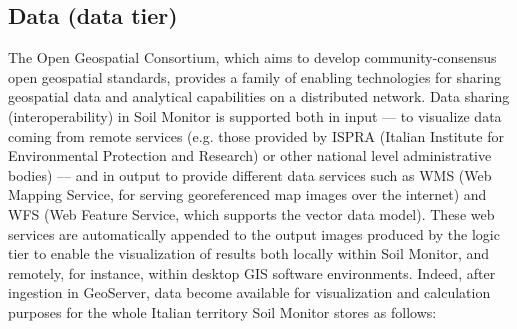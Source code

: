 \documentclass[APA,LATO1COL,doublespace]{WileyNJD-v2}
\newcommand{\update}[1]{\emph{\textcolor{blue}{#1}}}     %
\begin{document}
\subsection{Data (data tier) }
\label{sec:dataTier}
The Open Geospatial Consortium, which aims to develop community-consensus open geospatial standards, provides a family of enabling technologies for sharing geospatial data and analytical capabilities on a distributed network. 
Data sharing (interoperability) in Soil Monitor is supported both in input --- to visualize data coming from remote services (e.g. those provided by ISPRA (Italian Institute for Environmental Protection and Research) or other national level administrative bodies) --- and in output to provide different data services such as WMS (Web Mapping Service, for serving georeferenced map images over the internet) and WFS (Web Feature Service, which supports the vector data model). %
These web services are automatically appended to the output images produced by the logic tier %
to enable the visualization of results both locally within Soil Monitor, and remotely, for instance, within desktop GIS software environments.
Indeed, after ingestion in GeoServer, data become available for visualization and calculation purposes for the whole Italian territory Soil Monitor stores as follows:
\end{document}
